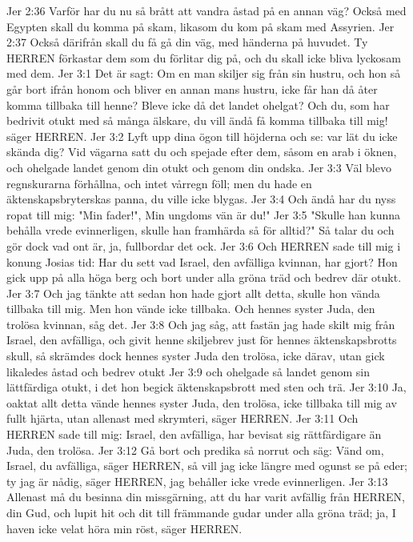 Jer 2:36  Varför har du nu så brått att vandra åstad på en annan väg? Också med Egypten skall du komma på skam, likasom du kom på skam med Assyrien.
Jer 2:37  Också därifrån skall du få gå din väg, med händerna på huvudet. Ty HERREN förkastar dem som du förlitar dig på, och du skall icke bliva lyckosam med dem.
Jer 3:1  Det är sagt: Om en man skiljer sig från sin hustru, och hon så går bort ifrån honom och bliver en annan mans hustru, icke får han då åter komma tillbaka till henne? Bleve icke då det landet ohelgat? Och du, som har bedrivit otukt med så många älskare, du vill ändå få komma tillbaka till mig! säger HERREN.
Jer 3:2  Lyft upp dina ögon till höjderna och se: var lät du icke skända dig? Vid vägarna satt du och spejade efter dem, såsom en arab i öknen, och ohelgade landet genom din otukt och genom din ondska.
Jer 3:3  Väl blevo regnskurarna förhållna, och intet vårregn föll; men du hade en äktenskapsbryterskas panna, du ville icke blygas.
Jer 3:4  Och ändå har du nyss ropat till mig: "Min fader!", Min ungdoms vän är du!"
Jer 3:5  "Skulle han kunna behålla vrede evinnerligen, skulle han framhärda så för alltid?" Så talar du och gör dock vad ont är, ja, fullbordar det ock.
Jer 3:6  Och HERREN sade till mig i konung Josias tid: Har du sett vad Israel, den avfälliga kvinnan, har gjort? Hon gick upp på alla höga berg och bort under alla gröna träd och bedrev där otukt.
Jer 3:7  Och jag tänkte att sedan hon hade gjort allt detta, skulle hon vända tillbaka till mig. Men hon vände icke tillbaka. Och hennes syster Juda, den trolösa kvinnan, såg det.
Jer 3:8  Och jag såg, att fastän jag hade skilt mig från Israel, den avfälliga, och givit henne skiljebrev just för hennes äktenskapsbrotts skull, så skrämdes dock hennes syster Juda den trolösa, icke därav, utan gick likaledes åstad och bedrev otukt
Jer 3:9  och ohelgade så landet genom sin lättfärdiga otukt, i det hon begick äktenskapsbrott med sten och trä.
Jer 3:10  Ja, oaktat allt detta vände hennes syster Juda, den trolösa, icke tillbaka till mig av fullt hjärta, utan allenast med skrymteri, säger HERREN.
Jer 3:11  Och HERREN sade till mig: Israel, den avfälliga, har bevisat sig rättfärdigare än Juda, den trolösa.
Jer 3:12  Gå bort och predika så norrut och säg: Vänd om, Israel, du avfälliga, säger HERREN, så vill jag icke längre med ogunst se på eder; ty jag är nådig, säger HERREN, jag behåller icke vrede evinnerligen.
Jer 3:13  Allenast må du besinna din missgärning, att du har varit avfällig från HERREN, din Gud, och lupit hit och dit till främmande gudar under alla gröna träd; ja, I haven icke velat höra min röst, säger HERREN.
